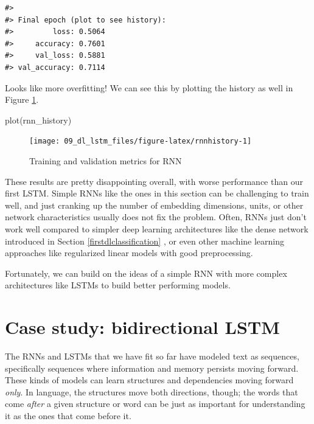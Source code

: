 \documentclass[
]{krantz}
\makeatletter
\newenvironment{Shaded}{\begin{snugshade}}{\end{snugshade}}
\newcommand{\FunctionTok}[1]{\textcolor[rgb]{0.00,0.00,0.00}{#1}}
\newcommand{\NormalTok}[1]{#1}
\newenvironment{kframe}{%
\medskip{}
\setlength{\fboxsep}{.8em}
 \def\at@end@of@kframe{}%
 \ifinner\ifhmode%
  \def\at@end@of@kframe{\end{minipage}}%
  \begin{minipage}{\columnwidth}%
 \fi\fi%
 \def\FrameCommand##1{\hskip\@totalleftmargin \hskip-\fboxsep
 \colorbox{shadecolor}{##1}\hskip-\fboxsep
     \hskip-\linewidth \hskip-\@totalleftmargin \hskip\columnwidth}%
 \MakeFramed {\advance\hsize-\width
   \@totalleftmargin\z@ \linewidth\hsize
   \@setminipage}}%
 {\par\unskip\endMakeFramed%
 \at@end@of@kframe}
\renewenvironment{Shaded}{\begin{kframe}}{\end{kframe}}
\makeatother
\begin{document}
\begin{verbatim}
#> 
#> Final epoch (plot to see history):
#>         loss: 0.5064
#>     accuracy: 0.7601
#>     val_loss: 0.5881
#> val_accuracy: 0.7114
\end{verbatim}

Looks like more overfitting! We can see this by plotting the history as well in Figure \ref{fig:rnnhistory}.

\begin{Shaded}
\begin{Highlighting}[]
\FunctionTok{plot}\NormalTok{(rnn\_history)}
\end{Highlighting}
\end{Shaded}

\begin{figure}

{\centering \texttt{[image: 09\_dl\_lstm\_files/figure-latex/rnnhistory-1]} 

}

\caption{Training and validation metrics for RNN}\label{fig:rnnhistory}
\end{figure}

These results are pretty disappointing overall, with worse performance than our first LSTM. Simple RNNs like the ones in this section can be challenging to train well, and just cranking up the number of embedding dimensions, units, or other network characteristics usually does not fix the problem. Often, RNNs just don't work well compared to simpler deep learning architectures like the dense network introduced in Section \ref{firstdlclassification} \citep{Minaee2020}, or even other machine learning approaches like regularized linear models with good preprocessing.

Fortunately, we can build on the ideas of a simple RNN with more complex architectures like LSTMs to build better performing models.

\hypertarget{bilstm}{%
\section{Case study: bidirectional LSTM}\label{bilstm}}

The RNNs and LSTMs that we have fit so far have modeled text as sequences, specifically sequences where information and memory persists moving forward. These kinds of models can learn structures and dependencies moving forward \emph{only}. In language, the structures move both directions, though; the words that come \emph{after} a given structure or word can be just as important for understanding it as the ones that come before it.
\end{document}
